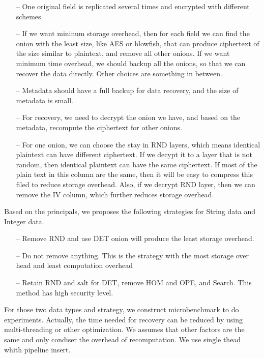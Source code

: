 \begin{itemize}
\item[--] One original field is replicated several times and encrypted with different schemes
\item[--] If we want mininum storage overhead, then for each field we can find the onion with the least size, like AES or blowfish, that can produce ciphertext of the size similar to plaintext, and remove all other onions. If we want minimum time overhead, we should backup all the onions, so that we can recover the data directly. Other choices are something in between.
\item[--] Metadata should have a full backup for data recovery, and the size of metadata is small. 
\item[--] For recovery, we need to decrypt the onion we have, and based on the metadata, recompute the ciphertext for other onions.
\item[--] For one onion, we can choose the stay in RND layers, which means identical plaintext can have different ciphertext. If we decypt it to a layer that is not random, then identical plaintext can have the same ciphertext. If most of the plain text in this column are the same, then it will be easy to compress this filed to reduce storage overhead. Also, if we decrypt RND layer, then we can remove the IV column, which further reduces storage overhead.
\end{itemize}


Based on the principals, we proposes the following strategies for String data and Integer data. 

\begin{itemize}
\item[--] Remove RND and use DET onion will produce the least storage overhead.
\item[--] Do not remove anything. This is the strategy with the most storage over head and least computation overhead
\item[--] Retain RND and salt for DET, remove HOM and OPE, and Search. This method has high security level.
\end{itemize}




For those two data types and strategy, we construct microbenchmark to do experiments. Actually, the time needed for recovery can be reduced by using multi-threading or other optimization. We assumes that other factors are the same and only condiser the overhead of recomputation. We use single thead whith pipeline insert.

